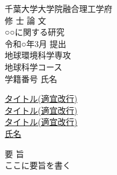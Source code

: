 \documentclass[paper=a4paper,hanging_punctuation,jafontscale=0.92469,titlepage,fontsize=12pt]{jlreq}
\begin{document}
\setlength{\baselineskip}{15pt}   %

\begin{center}
  {\Huge 千葉大学大学院融合理工学府}\\[3cm]
  {\LARGE 修 士 論 文}\\[3cm]
  {\huge ○○に関する研究}\\[2cm]
  {\Large 令和○年3月 提出}\\[3cm]
  {\Large 地球環境科学専攻}\\
  {\Large 地球科学コース}\\[2cm]
  学籍番号 \hspace{2cm} 氏名
\end{center}

\newpage

\begin{center}
  \vspace*{4cm}
  {\Huge \underline{タイトル(適宜改行)}\\
    \underline{タイトル(適宜改行)}\\
    \underline{タイトル(適宜改行)}}\\[4cm]
  {\Large \underline{氏名}}
\end{center}

\newpage

\begin{center}
  {\Huge 要 旨}\\[1cm]
  \Large{ここに要旨を書く}

\end{center}

\vspace{2cm}

\newpage
\tableofcontents    %
\newpage
\listoffigures      %
\newpage
\listoftables       %
\newpage

























%
\end{document}
